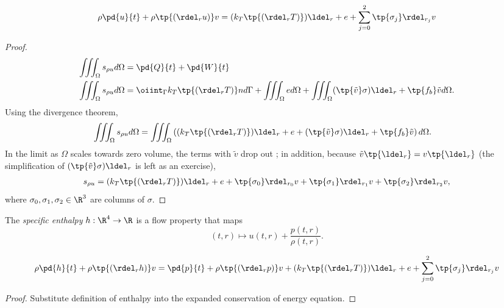 \begin{thm}
\begin{equation}
    \rho \pd{u}{t} + \rho \tp{(\rdel_r u )} v  = (k_T \tp{\left( \rdel_r T\right)} ) \ldel_r + e + \sum_{j=0}^2 \tp{\sigma_j} \rdel_{r_j} v
\end{equation}
\end{thm}
\begin{proof}
\begin{align}
    \iiint_\Omega s_{\rho u} d\Omega &= \pd{Q}{t} + \pd{W}{t} \\
    \iiint_\Omega s_{\rho u} d\Omega &= 
        \oiint_\Gamma k_T \tp{\left( \rdel_r T\right)} n d\Gamma + \iiint_\Omega e d\Omega +
        \iiint_\Omega (\tp{\tilde{v}} \sigma) \ldel_r + \tp{f_b} \tilde{v} d\Omega.
\end{align}
Using the divergence theorem,
\begin{align}
    \iiint_\Omega s_{\rho u} d\Omega &= 
        \iiint_\Omega \left( (k_T \tp{\left( \rdel_r T\right)} ) \ldel_r + e +
        (\tp{\tilde{v}} \sigma) \ldel_r + \tp{f_b} \tilde{v} \right) d\Omega.
\end{align}
In the limit as $\Omega$ scales towards zero volume, the terms with $\tilde{v}$ drop out
; in addition, because $\tilde{v}\tp{\ldel_r} = v\tp{\ldel_r}$ (the simplification of $(\tp{\tilde{v}}\sigma)\ldel_r$
is left as an exercise),
\begin{align}
    s_{\rho u} = (k_T \tp{\left( \rdel_r T\right)} ) \ldel_r + e +
        \tp{\sigma_0} \rdel_{r_0} v + \tp{\sigma_1} \rdel_{r_1} v + \tp{\sigma_2} \rdel_{r_2} v, \\
\end{align}
where $\sigma_0, \sigma_1, \sigma_2 \in \R^3$ are columns of $\sigma$.

\end{proof}


\begin{df}
The \emph{specific enthalpy} $h:\R^4\to \R$ is a flow property that maps
    \begin{equation}
        (t,r) \mapsto u(t,r) + \frac{p(t,r)}{\rho(t,r)}.
    \end{equation}
\end{df}

\begin{thm}
\begin{equation}
    \rho \pd{h}{t} + \rho \tp{(\rdel_r h )} v  = 
    \pd{p}{t} + \rho \tp{(\rdel_r p )} v +
    (k_T \tp{\left( \rdel_r T\right)} ) \ldel_r + e + \sum_{j=0}^2 \tp{\sigma_j} \rdel_{r_j} v
\end{equation}
\end{thm}
\begin{proof}
Substitute definition of enthalpy into the expanded conservation of energy equation.
\end{proof}

